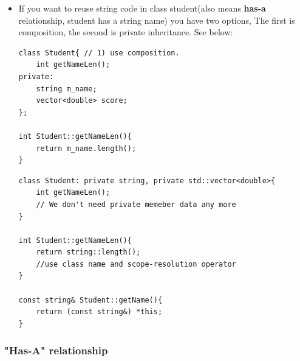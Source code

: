 \documentclass[a4paper,11pt,twoside]{book}
\begin{document}
\begin{itemize}
\item If you want to reuse string code in class student(also means \textbf{has-a} relationship, student has a string name) you have two options, The first is composition,  the second is private inheritance. See below:
\begin{lstlisting}[numbers=none]
class Student{ // 1) use composition.
	int getNameLen();
private:
	string m_name;
	vector<double> score;
};

int Student::getNameLen(){
	return m_name.length();
}
\end{lstlisting}

\begin{lstlisting}[numbers=none]
class Student: private string, private std::vector<double>{
	int getNameLen();
	// We don't need private memeber data any more
}

int Student::getNameLen(){
	return string::length();
	//use class name and scope-resolution operator
}

const string& Student::getName(){
	return (const string&) *this;
}
\end{lstlisting}
\end{itemize}

\subsubsection{"Has-A" relationship}
\end{document}
